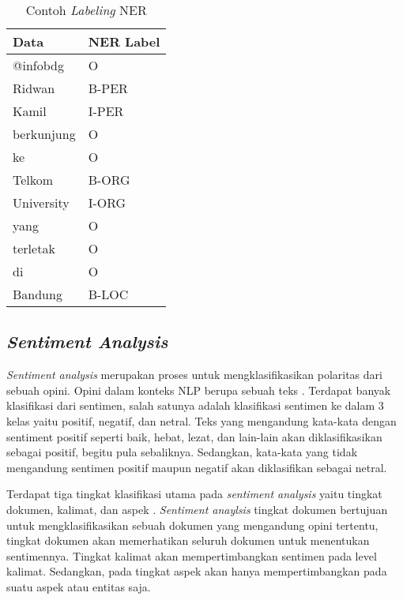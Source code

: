 \begin{table}[h]
    \vspace{0.25cm}
    \caption{Contoh \textit{Labeling} NER \parencite{ner}}
    \label{table:contoh-labeling-ner}
    \begin{center}
        \begin{tabular}{ll}
            \hline
            \textbf{Data} & \textbf{NER Label} \\ \hline
            @infobdg & O \\ \hline
            Ridwan & B-PER \\ \hline
            Kamil & I-PER \\ \hline
            berkunjung & O \\ \hline
            ke & O \\ \hline
            Telkom & B-ORG \\ \hline
            University & I-ORG \\ \hline
            yang & O \\ \hline
            terletak & O \\ \hline
            di & O \\ \hline
            Bandung & B-LOC \\ \hline
        \end{tabular}
    \end{center}
\end{table}

\subsection{\textit{Sentiment Analysis}}

\textit{Sentiment analysis} merupakan proses untuk mengklasifikasikan polaritas dari sebuah opini. Opini dalam konteks NLP berupa sebuah teks \parencite{sentiment_stock}. Terdapat banyak klasifikasi dari sentimen, salah satunya adalah klasifikasi sentimen ke dalam 3 kelas yaitu positif, negatif, dan netral. Teks yang mengandung kata-kata dengan sentiment positif seperti baik, hebat, lezat, dan lain-lain akan diklasifikasikan sebagai positif, begitu pula sebaliknya. Sedangkan, kata-kata yang tidak mengandung sentimen positif maupun negatif akan diklasifikan sebagai netral.

Terdapat tiga tingkat klasifikasi utama pada \textit{sentiment analysis} yaitu tingkat dokumen, kalimat, dan aspek \parencite{sentiment_algo}. \textit{Sentiment anaylsis} tingkat dokumen bertujuan untuk mengklasifikasikan sebuah dokumen yang mengandung opini tertentu, tingkat dokumen akan memerhatikan seluruh dokumen untuk menentukan sentimennya. Tingkat kalimat akan mempertimbangkan sentimen pada level kalimat. Sedangkan, pada tingkat aspek akan hanya mempertimbangkan pada suatu aspek atau entitas saja.

